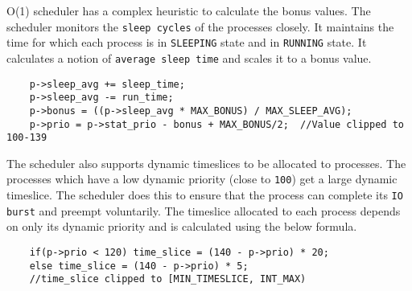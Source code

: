 \documentclass[11pt]{article}
\begin{document}
\vspace{2.5mm}
\hspace{10mm} O(1) scheduler has a complex heuristic to calculate the bonus values. The scheduler monitors the \texttt{sleep cycles} of the processes closely. It maintains the time for which each process is in \texttt{SLEEPING} state and in \texttt{RUNNING} state. It calculates a notion of \texttt{average sleep time} and scales it to a bonus value.\\

\begin{verbatim}
    p->sleep_avg += sleep_time;
    p->sleep_avg -= run_time;
    p->bonus = ((p->sleep_avg * MAX_BONUS) / MAX_SLEEP_AVG);
    p->prio = p->stat_prio - bonus + MAX_BONUS/2;  //Value clipped to 100-139
\end{verbatim}

\hspace{10mm} The scheduler also supports dynamic timeslices to be allocated to processes. The processes which have a low dynamic priority (close to \texttt{100}) get a large dynamic timeslice. The scheduler does this to ensure that the process can complete its \texttt{IO burst} and preempt voluntarily. The timeslice allocated to each process depends on only its dynamic priority and is calculated using the below formula.\\

\begin{verbatim}
    if(p->prio < 120) time_slice = (140 - p->prio) * 20;
    else time_slice = (140 - p->prio) * 5;
    //time_slice clipped to [MIN_TIMESLICE, INT_MAX)
\end{verbatim}

\pagebreak

\end{document}
